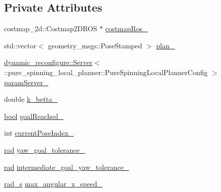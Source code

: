 \subsection*{Private Attributes}
\begin{DoxyCompactItemize}
\item 
costmap\+\_\+2d\+::\+Costmap2\+D\+R\+OS $\ast$ \hyperlink{classcl__move__base__z_1_1pure__spinning__local__planner_1_1PureSpinningLocalPlanner_a63f75481071df118d56e8b652e68b002}{costmap\+Ros\+\_\+}
\item 
std\+::vector$<$ geometry\+\_\+msgs\+::\+Pose\+Stamped $>$ \hyperlink{classcl__move__base__z_1_1pure__spinning__local__planner_1_1PureSpinningLocalPlanner_a31875ee78bae4698b579e20c0754860d}{plan\+\_\+}
\item 
\hyperlink{strikes__back_2servers_2led__action__server_2src_2led__action__server__node_8cpp_a2036ae39d23f8e14a2cc8ddcd46dea5a}{dynamic\+\_\+reconfigure\+::\+Server}$<$\+::pure\+\_\+spinning\+\_\+local\+\_\+planner\+::\+Pure\+Spinning\+Local\+Planner\+Config $>$ \hyperlink{classcl__move__base__z_1_1pure__spinning__local__planner_1_1PureSpinningLocalPlanner_a5e91943cf4500d35199004a09cc09ca4}{param\+Server\+\_\+}
\item 
double \hyperlink{classcl__move__base__z_1_1pure__spinning__local__planner_1_1PureSpinningLocalPlanner_a379d2ba057231d76edd1a661d3572d68}{k\+\_\+betta\+\_\+}
\item 
\hyperlink{classbool}{bool} \hyperlink{classcl__move__base__z_1_1pure__spinning__local__planner_1_1PureSpinningLocalPlanner_aecfe0dfc68b8c8e461e8b684e5fa4d2f}{goal\+Reached\+\_\+}
\item 
int \hyperlink{classcl__move__base__z_1_1pure__spinning__local__planner_1_1PureSpinningLocalPlanner_aa0f9b4cf52a76e44dc2cfc5103d52dcd}{current\+Pose\+Index\+\_\+}
\item 
\hyperlink{backward__local__planner_8h_a640effbe91ae9b25d698a883a9e80d96}{rad} \hyperlink{classcl__move__base__z_1_1pure__spinning__local__planner_1_1PureSpinningLocalPlanner_a07334cd7bf29f391c2553f0038fa94e8}{yaw\+\_\+goal\+\_\+tolerance\+\_\+}
\item 
\hyperlink{backward__local__planner_8h_a640effbe91ae9b25d698a883a9e80d96}{rad} \hyperlink{classcl__move__base__z_1_1pure__spinning__local__planner_1_1PureSpinningLocalPlanner_a2e8dfda5e9dea6f09db4056aa90b2aa8}{intermediate\+\_\+goal\+\_\+yaw\+\_\+tolerance\+\_\+}
\item 
\hyperlink{pure__spinning__local__planner_8h_a76bf9d2bc75b779e3418b2320c652037}{rad\+\_\+s} \hyperlink{classcl__move__base__z_1_1pure__spinning__local__planner_1_1PureSpinningLocalPlanner_a20edb2db356925684de4ee4fe03d5992}{max\+\_\+angular\+\_\+z\+\_\+speed\+\_\+}
\end{DoxyCompactItemize}


